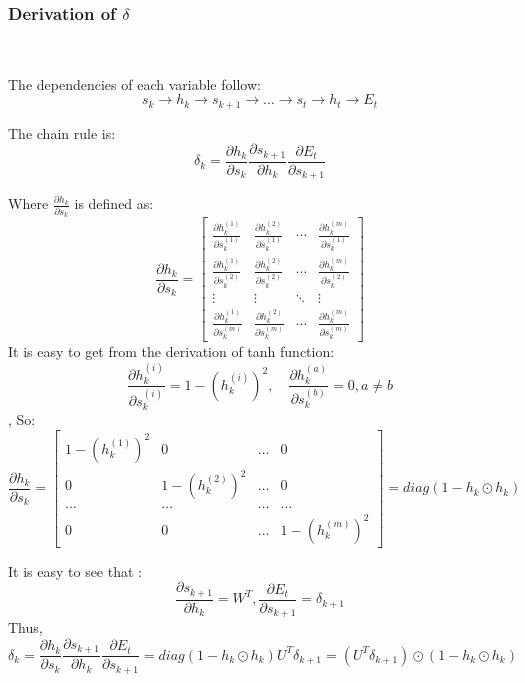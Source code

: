 \documentclass[oneside,solution]{seu-ml-assign}
\begin{document}
\subsubsection{Derivation of $\delta$}

\

The dependencies of each variable follow:
\[
  s_k \rightarrow h_k \rightarrow s_{k+1} \rightarrow \dots \rightarrow s_t \rightarrow h_t \rightarrow E_t
\]


The chain rule is:
\[
  \delta_k = \frac{\partial h_k}{\partial s_k} \frac{\partial s_{k+1}}{\partial h_k} \frac{\partial E_t}{\partial s_{k+1}}
\]

Where $\frac{\partial h_k}{\partial s_k}$ is defined as:
\[
  \frac{\partial h_k}{\partial s_k} =
  \begin{bmatrix}
    \frac{\partial h_k^{(1)}}{\partial s_k^{(1)}} & \frac{\partial h_k^{(2)}}{\partial s_k^{(1)}} & \cdots & \frac{\partial h_k^{(m)}}{\partial s_k^{(1)}} \\
    \frac{\partial h_k^{(1)}}{\partial s_k^{(2)}} & \frac{\partial h_k^{(2)}}{\partial s_k^{(2)}} & \cdots & \frac{\partial h_k^{(m)}}{\partial s_k^{(2)}} \\
    \vdots                                        & \vdots                                        & \ddots & \vdots                                        \\
    \frac{\partial h_k^{(1)}}{\partial s_k^{(m)}} & \frac{\partial h_k^{(2)}}{\partial s_k^{(m)}} & \cdots & \frac{\partial h_k^{(m)}}{\partial s_k^{(m)}}
  \end{bmatrix}
\]
It is easy to get from the derivation of tanh function:
\begin{equation}\frac{\partial h_k^{(i)}}{\partial s_k^{(i)}}=1-(h_k^{(i)})^2,\quad\frac{\partial h_k^{(a)}}{\partial s_k^{(b)}}=0,a\neq b\end{equation},
So:
\begin{equation}\frac{\partial h_k}{\partial s_k}=\begin{bmatrix}1-(h_k^{(1)})^2 & 0     & \dots & 0     \\0&1-(h_k^{(2)})^2&\dots&0\\
               \dots           & \dots & \dots & \dots \\0&0&\dots&1-(h_k^{(m)})^2\end{bmatrix}=diag(1-h_k\odot h_k)\end{equation}

It is easy to see that :
\begin{equation}\frac{\partial s_{k+1}}{\partial h_k}=W^T,\frac{\partial E_t}{\partial s_{k+1}}=\delta_{k+1}\end{equation}
Thus,
\begin{equation}\delta_k=\frac{\partial h_k}{\partial s_k}\frac{\partial s_{k+1}}{\partial h_k}\frac{\partial E_t}{\partial s_{k+1}}
  =diag(1-h_k\odot h_k)U^T\delta_{k+1}=(U^T\delta_{k+1})\odot(1-h_k\odot h_k)\end{equation}
\end{document}

